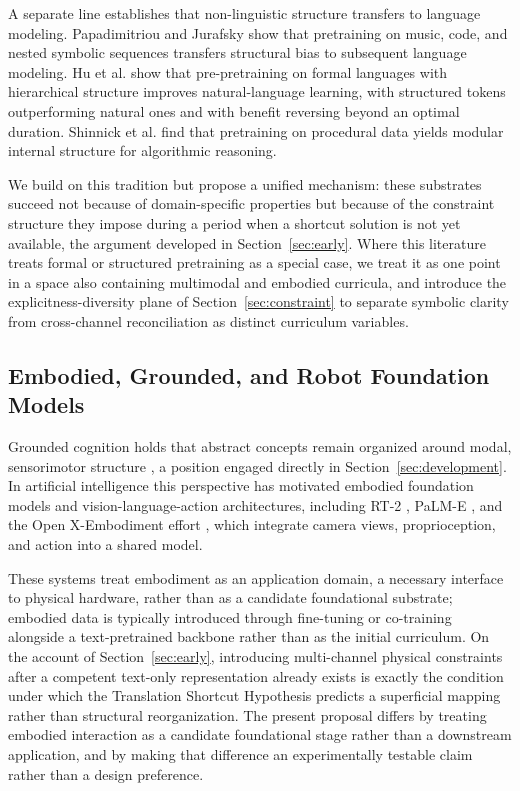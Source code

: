 \documentclass[11pt]{article}
\begin{document}
A separate line establishes that non-linguistic structure transfers to language modeling. Papadimitriou and Jurafsky \cite{papadimitriou2020learning} show that pretraining on music, code, and nested symbolic sequences transfers structural bias to subsequent language modeling. Hu et al. \cite{hu2025formal} show that pre-pretraining on formal languages with hierarchical structure improves natural-language learning, with structured tokens outperforming natural ones and with benefit reversing beyond an optimal duration. Shinnick et al. \cite{shinnick2025procedural} find that pretraining on procedural data yields modular internal structure for algorithmic reasoning.

We build on this tradition but propose a unified mechanism: these substrates succeed not because of domain-specific properties but because of the constraint structure they impose during a period when a shortcut solution is not yet available, the argument developed in Section~\ref{sec:early}. Where this literature treats formal or structured pretraining as a special case, we treat it as one point in a space also containing multimodal and embodied curricula, and introduce the explicitness-diversity plane of Section~\ref{sec:constraint} to separate symbolic clarity from cross-channel reconciliation as distinct curriculum variables.

\subsection{Embodied, Grounded, and Robot Foundation Models}
\label{sec:rel-embodied}

Grounded cognition holds that abstract concepts remain organized around modal, sensorimotor structure \cite{barsalou1999perceptual, lakoff1980metaphors}, a position engaged directly in Section~\ref{sec:development}. In artificial intelligence this perspective has motivated embodied foundation models and vision-language-action architectures, including RT-2 \cite{brohan2023rt2}, PaLM-E \cite{driess2023palme}, and the Open X-Embodiment effort \cite{padalkar2023open}, which integrate camera views, proprioception, and action into a shared model.

These systems treat embodiment as an application domain, a necessary interface to physical hardware, rather than as a candidate foundational substrate; embodied data is typically introduced through fine-tuning or co-training alongside a text-pretrained backbone rather than as the initial curriculum. On the account of Section~\ref{sec:early}, introducing multi-channel physical constraints after a competent text-only representation already exists is exactly the condition under which the Translation Shortcut Hypothesis predicts a superficial mapping rather than structural reorganization. The present proposal differs by treating embodied interaction as a candidate foundational stage rather than a downstream application, and by making that difference an experimentally testable claim rather than a design preference.
\end{document}
